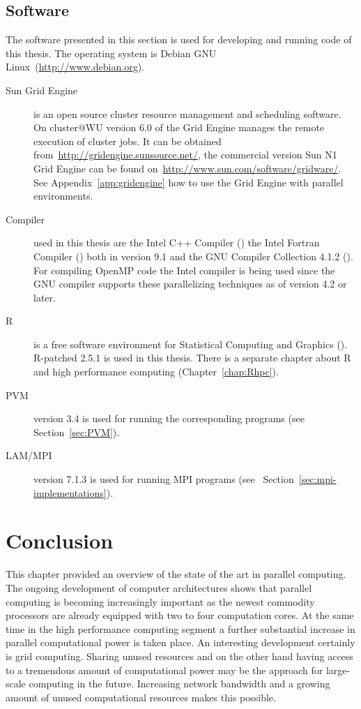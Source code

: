 \subsection{Software}

The software presented in this section is used for developing and
running code of this thesis. The operating system is Debian GNU
Linux~(\url{http://www.debian.org}).
 
\begin{description}
\item[Sun Grid Engine] is an open source cluster resource management
  and scheduling software. On cluster@WU version 6.0 of the Grid
  Engine manages the remote execution of cluster jobs. It can be obtained
  from~\url{http://gridengine.sunsource.net/}, the commercial version
  Sun N1 Grid Engine can be found
  on~\url{http://www.sun.com/software/gridware/}. See
  Appendix~\ref{app:gridengine} how to use the Grid Engine with
  parallel environments.
\item[Compiler] used in this thesis are the Intel C++ Compiler
  (\cite{icc07}) the Intel Fortran Compiler (\cite{ifort07}) both in
  version 9.1 
  and the GNU Compiler Collection 4.1.2 (\cite{gcc07}). For compiling
  OpenMP code the 
  Intel compiler is being used since the GNU compiler supports these
  parallelizing techniques as of version 4.2 or later.
\item[R] is a free software environment for Statistical Computing and
  Graphics (\cite{Rcore07R}). R-patched 2.5.1 is used in this
  thesis. There is a separate
  chapter about R and high performance computing (Chapter~\ref{chap:Rhpc}).
\item[PVM] version 3.4 is used for running the corresponding programs
  (see Section~\ref{sec:PVM}).
\item[LAM/MPI] version 7.1.3 is used for running MPI programs (see~
  Section~\ref{sec:mpi-implementations}). 
\end{description}

\section{Conclusion}

This chapter provided an overview of the state of the art in parallel
computing. The ongoing development of computer architectures shows that
parallel computing is becoming increasingly important as the newest
commodity processors are already equipped with two to four computation
cores. At the same time in the high performance computing segment a
further substantial increase in parallel computational power is taken
place. An interesting development certainly is grid computing. Sharing
unused resources and on the other hand having access to a tremendous
amount of computational power may be the approach for large-scale
computing in the future. Increasing network bandwidth and a growing
amount of unused computational resources makes this possible.


